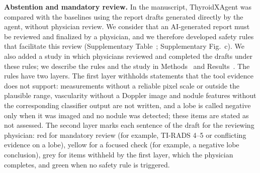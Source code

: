 \textbf{Abstention and mandatory review.} In the manuscript, ThyroidXAgent was compared with the baselines using the report drafts generated directly by the agent, without physician review. We consider that an AI-generated report must be reviewed and finalized by a physician, and we therefore developed safety rules that facilitate this review (Supplementary Table~\SuppTabRules{}; Supplementary Fig.~\SuppFigReview{}c). We also added a study in which physicians reviewed and completed the drafts under these rules; we describe the rules and the study in Methods~\SecMethReader{} and Results~\SecResReport{}. The rules have two layers. The first layer withholds statements that the tool evidence does not support: measurements without a reliable pixel scale or outside the plausible range, vascularity without a Doppler image and nodule features without the corresponding classifier output are not written, and a lobe is called negative only when it was imaged and no nodule was detected; these items are stated as not assessed. The second layer marks each sentence of the draft for the reviewing physician: red for mandatory review (for example, TI-RADS 4--5 or conflicting evidence on a lobe), yellow for a focused check (for example, a negative lobe conclusion), grey for items withheld by the first layer, which the physician completes, and green when no safety rule is triggered.\par


